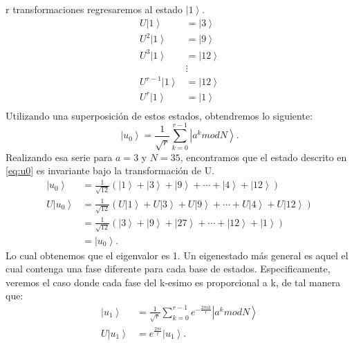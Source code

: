 r transformaciones regresaremos al estado $\left|1\right\rangle$.
\begin{align*}
    U\left| 1 \right\rangle &= \left|3\right\rangle \\
    U^2\left| 1 \right\rangle &= \left|9\right\rangle \\
    U^3\left| 1 \right\rangle &= \left|12\right\rangle \\ 
                    & \vdots  \\ 
    U^{r-1}\left| 1 \right\rangle &= \left|12\right\rangle \\
    U^r\left| 1 \right\rangle &= \left|1\right\rangle \\
\end{align*}
Utilizando una superposición de estos estados, obtendremos lo siguiente:
\begin{equation}
    \left| u_0 \right\rangle = \frac{1}{\sqrt{r}} \sum\limits_{k=0}^{r-1} \left|a^k mod N \right\rangle.
    \label{eq:u0}
\end{equation}
Realizando esa serie para $a=3$ y $N=35$, encontramos que el estado descrito en \ref{eq:u0} es invariante bajo la transformación de U.
\begin{align*}
    \left| u_0 \right\rangle &= \frac{1}{\sqrt{12}} \left(\left|1\right\rangle + \left|3\right\rangle+ \left|9\right\rangle 
    +\cdots +\left|4\right\rangle + \left|12\right\rangle \right)\\
    U\left| u_0 \right\rangle &= \frac{1}{\sqrt{12}} \left(U\left|1\right\rangle + U\left|3\right\rangle+ U\left|9\right\rangle 
    +\cdots +U\left|4\right\rangle + U\left|12\right\rangle \right)\\
    &= \frac{1}{\sqrt{12}} \left(\left|3\right\rangle + \left|9\right\rangle+ \left|27\right\rangle 
    +\cdots +\left|12\right\rangle + \left|1\right\rangle \right)\\
    &= \left| u_0 \right\rangle .
\end{align*}
Lo cual obtenemos que el eigenvalor es 1. Un eigenestado más general es aquel el cual contenga una fase diferente para cada base de estados. Especificamente, veremos el caso
donde cada fase del k-esimo es proporcional a k, de tal manera que:
\begin{align}
    \label{eq:u1}
    \left| u_1 \right\rangle &= \frac{1}{\sqrt{r}} \sum\limits_{k=0}^{r-1} e^{-\frac{2\pi i k}{r}} \left| a^k mod N \right\rangle \\
    \label{eq:ua1}
    U\left| u_1 \right\rangle &= e^{\frac{2\pi i}{r}} \left| u_1 \right\rangle.
\end{align}
